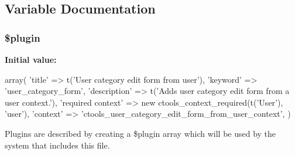 \subsection{Variable Documentation}
\hypertarget{user__category__edit__form__from__user_8inc_ada8a7130088351710bb02ed622d6bf65}{
\subsubsection[{\$plugin}]{\setlength{\rightskip}{0pt plus 5cm}\$plugin}}
\label{user__category__edit__form__from__user_8inc_ada8a7130088351710bb02ed622d6bf65}
{\bfseries Initial value:}
\begin{DoxyCode}
 array(
  'title' => t('User category edit form from user'),
  'keyword' => 'user_category_form',
  'description' => t('Adds user category edit form from a user context.'),
  'required context' => new ctools_context_required(t('User'), 'user'),
  'context' => 'ctools_user_category_edit_form_from_user_context',
)
\end{DoxyCode}
Plugins are described by creating a \$plugin array which will be used by the system that includes this file. 